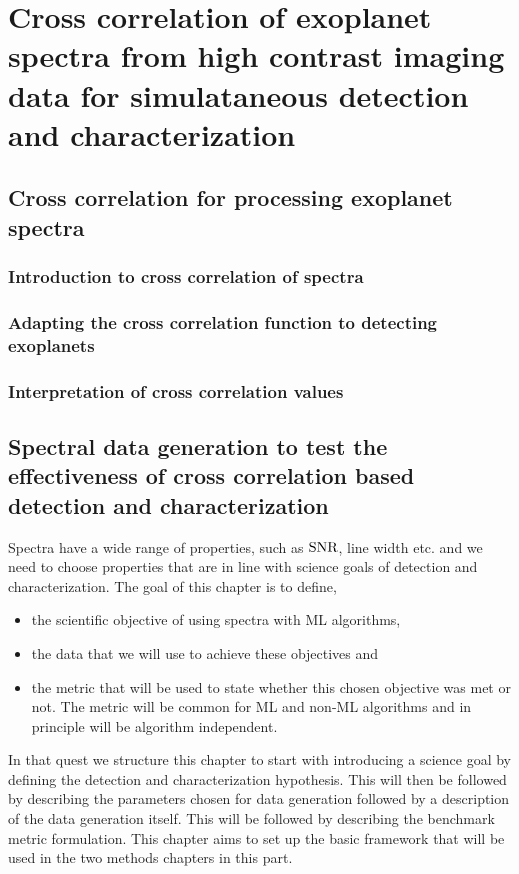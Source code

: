 \part{Cross correlation of exoplanet spectra from high contrast imaging data for simulataneous detection and characterization}
\startcontents[chapters]
\printmyminitoc{}
\chapter{Cross correlation for processing exoplanet spectra}
\label{chap:II.1}
\section{Introduction to cross correlation of spectra}
\section{Adapting the cross correlation function to detecting exoplanets}
\section{Interpretation of cross correlation values}

\chapter{Spectral data generation to test the effectiveness of cross correlation based detection and characterization}
\label{chap:II.2}
Spectra have a wide range of properties, such as $\rm{SNR}$, line width etc. and we need to choose properties that are in line with science goals of detection and characterization.
The goal of this chapter is to define,
\begin{itemize}
    \item the scientific objective of using spectra with ML algorithms, 
    \item the data that we will use to achieve these objectives and
    \item the metric that will be used to state whether this chosen objective was met or not.
The metric will be common for ML and non-ML algorithms and in principle will be algorithm independent.
\end{itemize}
In that quest we structure this chapter to start with introducing a science goal by defining the detection and characterization hypothesis.
This will then be followed by describing the parameters chosen for data generation followed by a description of the data generation itself.
This will be followed by describing the benchmark metric formulation.
This chapter aims to set up the basic framework that will be used in the two methods chapters in this part.

